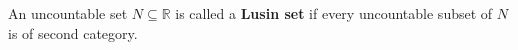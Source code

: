 An uncountable set $N \subseteq \mathbb{R}$ is called a \textbf{Lusin set} if every uncountable subset of $N$ is of second category.
